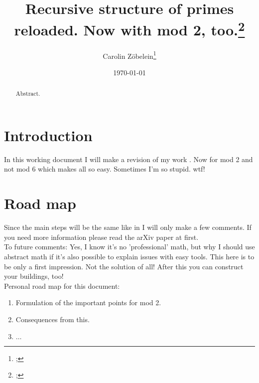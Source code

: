 

\title{Recursive structure of primes reloaded. Now with mod 2, too.\footnote{; }}
\date{\today}

\author{Carolin Z\"obelein\footnote{; }}
\maketitle
\begin{abstract}
	Abstract.
\end{abstract}
\tableofcontents
\section{Introduction}
\label{s:introduction}
In this working document I will make a revision of my work \cite{2014arXiv1411.2824Z}. Now for mod 2 and not mod 6 which makes all so easy. Sometimes I'm so stupid. wtf!
\section{Road map}
\label{s:roadmap}
Since the main steps will be the same like in \cite{2014arXiv1411.2824Z} I will only make a few comments. If you need more information please read the arXiv paper at first. \\

To future comments: Yes, I know it's no 'professional' math, but why I should use abstract math if it's also possible to explain issues with easy tools. This here is to be only a first impression. Not the solution of all! After this you can construct your buildings, too! \\ 
  
Personal road map for this document:
\begin{enumerate}
	\item Formulation of the important points for mod 2.
	\item Consequences from this.
	\item $\dots$
\label{en:roadmap}\end{enumerate}

